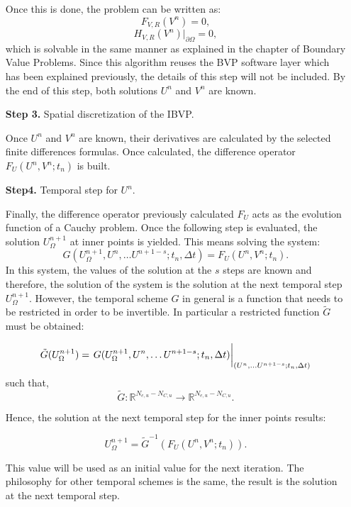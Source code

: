 \begin{enumerate}
        Once this is done, the problem can be written as: 
        $$ {F}_{V,R}({V}^n)=0, $$
        $$ H_{V,R}({V}^n)\big\rvert_{\partial \Omega}= 0, $$
        which is solvable in the same manner as explained in the chapter of Boundary Value Problems.
        Since this algorithm reuses the BVP software layer which has been explained previously, the details of this step will not be included. By the end of this step, both solutions $U^n$ and $V^n$ are known.
        
    
   	\item[\textbf{Step 3.}] Spatial discretization of the IBVP. 
   	
     Once $U^n$ and $V^n$ are known,  their derivatives are calculated by the selected finite differences formulas. Once calculated, the difference operator  $ {F}_U({U}^n,V^n;t_n)$ is built.   
    
    	\item[\textbf{Step4.}] Temporal step for $U^n$.
    
        Finally, the difference operator previously calculated $F_U$ acts as the evolution function of a Cauchy problem. Once the following step is evaluated,  the solution $U_{\Omega}^{n+1}$ at inner points is yielded. This means solving the system: 
        \begin{equation*}
        G({U}_{\Omega}^{n+1}, {U}^{n}, \ldots {U}^{n+1-s};t_n,  \Delta t)=  {F}_U({U}^n,V^n;t_n).
        \end{equation*}
        In this system, the values of the solution at the $s$ steps are known and therefore, the solution of the system is the solution at the next temporal step $U_{\Omega}^{n+1}$. However, the temporal scheme $G$ in general is a function that needs to be restricted in order to be invertible. In particular a restricted function $\tilde{G}$ must be obtained:
        
        $$\tilde{G}({U}_{\Omega}^{n+1}) = \eval{G({U}_{\Omega}^{n+1}, {U}^{n}, \ldots {U}^{n+1-s};t_n,  \Delta t)}_{({U}^{n}, \ldots {U}^{n+1-s};t_n,  \Delta t)}$$
        such that, 
        $$ \tilde{G}:\mathbb{ R}^{N_{e,u}-N_{C,u}} \rightarrow \mathbb{R}^{N_{e,u}-N_{C,u}}. $$
        
        Hence, the solution at the next temporal step for the inner points results:
        
        $$ U_{\Omega}^{n+1} = \tilde{G}^{-1}(F_U(U^n,V^n; t_n)) .$$
        
        
        This value will be used as an initial value for the next iteration. The philosophy for other temporal schemes is the same, the result is the solution at the next temporal step.
  
 \end{enumerate}  
        
